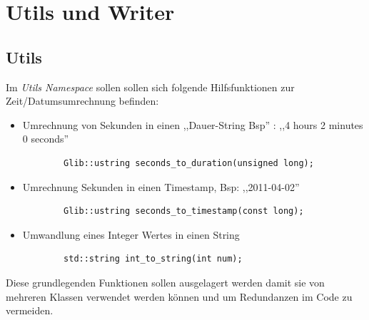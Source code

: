 \section{Utils und Writer} 

\subsection{Utils}
Im \emph{Utils Namespace} sollen sollen sich folgende Hilfsfunktionen zur Zeit/Datumsumrechnung befinden:

\begin{itemize}
    \item Umrechnung von Sekunden in einen ,,Dauer-String Bsp'' : ,,4 hours 2 minutes 0 seconds''

        \begin{verbatim}
        Glib::ustring seconds_to_duration(unsigned long);
        \end{verbatim}

    \item Umrechnung Sekunden in einen Timestamp, Bsp: ,,2011-04-02''
        \begin{verbatim}
        Glib::ustring seconds_to_timestamp(const long);
        \end{verbatim}

    \item Umwandlung eines Integer Wertes in einen String
        \begin{verbatim}
        std::string int_to_string(int num);
        \end{verbatim}
\end{itemize}


Diese grundlegenden Funktionen sollen ausgelagert werden damit sie von mehreren Klassen verwendet werden können und um Redundanzen im 
Code zu vermeiden.

